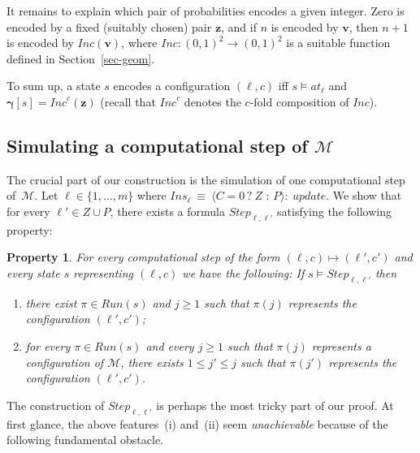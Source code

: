 \documentclass[a4paper,UKenglish,cleveref, autoref, thm-restate]{lipics-v2021}
\newcommand{\M}{\mathcal{M}}
\newcommand{\run}{\textit{Run}}
\newcommand{\Step}{\mathit{Step}}
\newcommand{\Ins}{\mathit{Ins}}
\newcommand{\at}{\mathit{at}}
\newcommand{\INC}{\mathit{Inc}}
\renewcommand{\vec}[1]{\pmb{#1}}
\newcommand{\update}{\textit{update}}
\newcommand{\cv}{\vec{\gamma}}
\newtheorem{prop}{Property}
\begin{document}
It remains to explain which pair of probabilities encodes a given integer. 
Zero is encoded by a fixed (suitably chosen) pair $\vec{z}$, and if $n$ is encoded by $\vec{v}$, then $n+1$ is encoded by $\INC(\vec{v})$, where $\INC : (0,1)^2 \to (0,1)^2$ is a suitable function defined in Section~\ref{sec-geom}. 

To sum up, a state $s$ encodes a configuration $(\ell,c)$ iff $s \models \at_\ell$ and $\cv[s] =  \INC^{c}(\vec{z})$ (recall that $\INC^{c}$ denotes the $c$-fold composition of $\INC$). 

\subsection{Simulating a computational step of $\M$}
\label{sec-sim-step}

The crucial part of our construction is the simulation of one computational step of~$\M$. Let $\ell \in \{1,\ldots,m\}$ where $\Ins_\ell ~\equiv~ \langle C{=}0\, {?}\ Z \mbox{ : } P \rangle:\ \update$. We show that for every $\ell' \in Z \cup P$, there exists a formula $\Step_{\ell,\ell'}$ satisfying the following property: 

\begin{prop}
\label{prop-step}
For every computational step of the form $(\ell,c) \mapsto (\ell',c')$ and every state $s$ representing $(\ell,c)$ we have the following: If $s \models \Step_{\ell,\ell'}$ then 
\begin{enumerate}
    \item[(i)] there exist $\pi \in \run(s)$ and $j\geq 1$ such that $\pi(j)$ represents the configuration $(\ell',c')$;
    \item[(ii)] for every $\pi \in \run(s)$ and every $j \geq 1$ such that $\pi(j)$ represents a configuration of $\M$, there exists $1 \leq j' \leq j$ such that $\pi(j')$ represents the configuration $(\ell',c')$. 
\end{enumerate}
\end{prop}

The construction of $\Step_{\ell,\ell'}$ is perhaps the most tricky part of our proof. At first glance, the above features~(i) and~(ii) seem \emph{unachievable} because of the following fundamental obstacle. 
\end{document}
